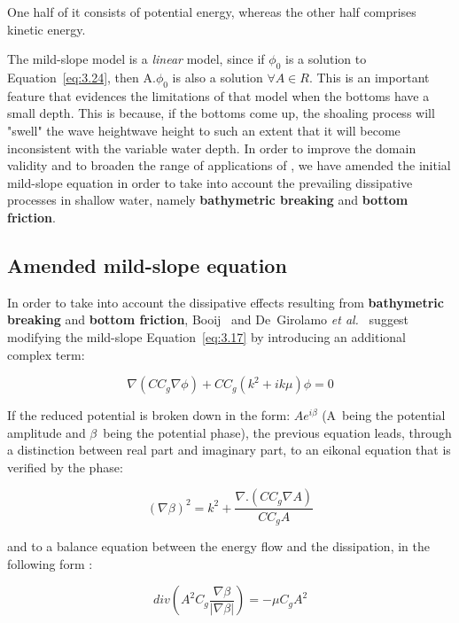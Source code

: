 One half of it consists of potential energy, whereas the other half comprises kinetic energy.

The mild-slope model is a \textit{linear} model, since if $\phi_{0}$ is a
solution to Equation~\eqref{eq:3.24}, then A.$\phi_{0}$ is also a
solution $\forall A\in R$. This is an important feature that evidences the
limitations of that model when the bottoms have a small depth. This is because,
if the bottoms come up, the shoaling process will "swell" the wave heightwave
height to such an extent that it will become inconsistent with the variable
water depth. In order to improve the domain validity and to broaden
the range of applications of \artemis{}, we have amended the initial
mild-slope equation in order to take into account the prevailing dissipative
processes in shallow water, namely \textbf{bathymetric breaking} and
\textbf{bottom friction}.


\subsection{Amended mild-slope equation}

In order to take into account the dissipative effects resulting from
\textbf{bathymetric breaking} and \textbf{bottom friction},
Booij~\cite{Booij1981} and De~Girolamo \textit{et al.}~\cite{Girolamo1988}
suggest modifying the mild-slope Equation~\eqref{eq:3.17} by introducing
an additional complex term:

\begin{equation}
  \nabla(CC_{g}\nabla\phi)+CC_{g}(k^{2}+ik\mu)\phi = 0
  \label{eq:3.33}
\end{equation}

If the reduced potential is broken down in the form: $Ae^{i\beta}$ (A~being the potential
amplitude and $\beta$~being the potential phase), the previous equation leads,
through a distinction between real part and imaginary part, to an eikonal
equation that is verified by the phase:

\begin{equation}
  (\nabla\beta)^{2} = k^{2} + \frac{\nabla.(CC_{g}\nabla A)}{CC_{g}A}
  \label{eq:3.34}
\end{equation}

and to a balance equation between the energy flow and the dissipation, in the following form :

\begin{equation}
  div\left(A^{2}C_{g}\frac{\nabla\beta}{|\nabla\beta|}\right) = -\mu C_{g}A^{2}
  \label{eq:3.35}
\end{equation}

